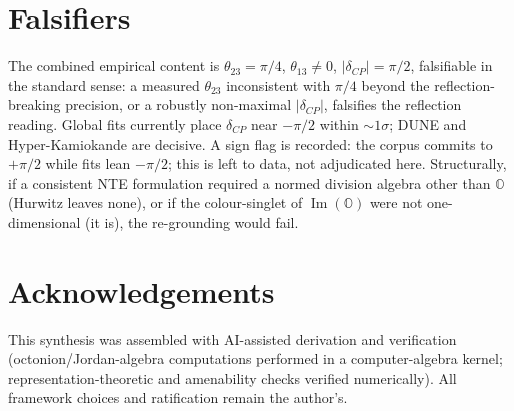 \documentclass[11pt]{article}
\theoremstyle{definition}
\newcommand{\OO}{\mathbb{O}}
\newcommand{\Imag}{\operatorname{Im}}
\begin{document}
\section{Falsifiers}

The combined empirical content is $\theta_{23}=\pi/4$, $\theta_{13}\neq0$, $|\delta_{CP}|=\pi/2$, falsifiable in the standard sense: a measured $\theta_{23}$ inconsistent with $\pi/4$ beyond the reflection-breaking precision, or a robustly non-maximal $|\delta_{CP}|$, falsifies the reflection reading. Global fits currently place $\delta_{CP}$ near $-\pi/2$ within $\sim1\sigma$; DUNE and Hyper-Kamiokande are decisive. A sign flag is recorded: the corpus commits to $+\pi/2$ while fits lean $-\pi/2$; this is left to data, not adjudicated here. Structurally, if a consistent NTE formulation required a normed division algebra other than $\OO$ (Hurwitz leaves none), or if the colour-singlet of $\Imag(\OO)$ were not one-dimensional (it is), the re-grounding would fail.

\section*{Acknowledgements}
This synthesis was assembled with AI-assisted derivation and verification (octonion/Jordan-algebra computations performed in a computer-algebra kernel; representation-theoretic and amenability checks verified numerically). All framework choices and ratification remain the author's.
\end{document}
